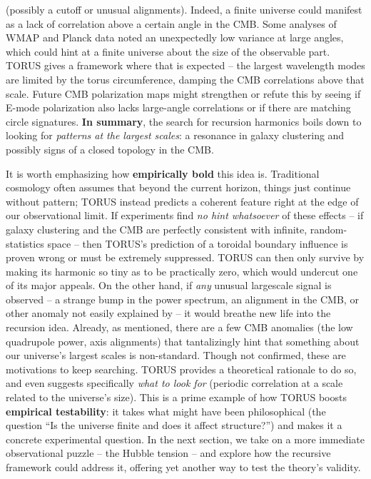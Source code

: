 \documentclass[
]{article}
\begin{document}
{(possibly a cutoff or unusual alignments). Indeed, a finite universe
could manifest as a lack of correlation above a certain angle in the
CMB. Some analyses of WMAP and Planck data noted an unexpectedly low
variance at large angles, which could hint at a finite universe about
the size of the observable part. TORUS gives a framework where that is
expected -- the largest wavelength modes are limited by the torus
circumference, damping the CMB correlations above that scale. Future CMB
polarization maps might strengthen or refute this by seeing if E-mode
polarization also lacks large-angle correlations or if there are
matching circle signatures. \textbf{In summary}, the search for
recursion harmonics boils down to looking for \emph{patterns at the
largest scales}: a resonance in galaxy clustering and possibly signs of
a closed topology in the CMB.

It is worth emphasizing how \textbf{empirically bold} this idea is.
Traditional cosmology often assumes that beyond the current horizon,
things just continue without pattern; TORUS instead predicts a coherent
feature right at the edge of our observational limit. If experiments
find \emph{no hint whatsoever} of these effects -- if galaxy clustering
and the CMB are perfectly consistent with infinite, random-statistics
space -- then TORUS's prediction of a toroidal boundary influence is
proven wrong or must be extremely suppressed\hspace{0pt}. TORUS can then
only survive by making its harmonic so tiny as to be practically zero,
which would undercut one of its major appeals. On the other hand, if
\emph{any} unusual largescale signal is observed -- a strange bump in
the power spectrum, an alignment in the CMB, or other anomaly not easily
explained by \LambdaCDM -- it would breathe new life into the recursion idea.
Already, as mentioned, there are a few CMB anomalies (the low quadrupole
power, axis alignments) that tantalizingly hint that something about our
universe's largest scales is non-standard\hspace{0pt}. Though not
confirmed, these are motivations to keep searching. TORUS provides a
theoretical rationale to do so, and even suggests specifically
\emph{what to look for} (periodic correlation at a scale related to the
universe's size). This is a prime example of how TORUS boosts
\textbf{empirical testability}: it takes what might have been
philosophical (the question ``Is the universe finite and does it affect
structure?'') and makes it a concrete experimental question. In the next
section, we take on a more immediate observational puzzle -- the Hubble
tension -- and explore how the recursive framework could address it,
offering yet another way to test the theory's validity.

}
\end{document}
